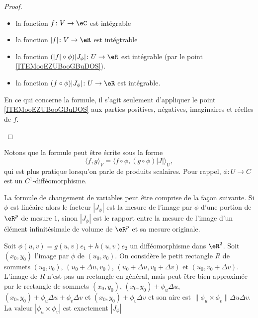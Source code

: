 \begin{proof}
\begin{enumerate}
            \begin{itemize}
                \item la fonction \( f\colon V\to \eC\) est intégrable
                \item la fonction \( | f |\colon V\to \eR\) est intégtrable
                \item la fonction \( (| f |\circ\phi)| J_{\phi} |\colon U\to \eR\) est intégrable (par le point \ref{ITEMooEZUBooGBuDOS}).
                \item la fonction \( (f\circ\phi)| J_{\phi} |\colon U\to \eR\) est intégrable.
            \end{itemize}
            En ce qui concerne la formule, il s'agit seulement d'appliquer le point \ref{ITEMooEZUBooGBuDOS} aux parties positives, négatives, imaginaires et réelles de \( f\).
    \end{enumerate}
\end{proof}

Notons que la formule peut être écrite sous la forme
\begin{equation}        \label{EQooQKARooELPCFO}
    \langle f, g\rangle_V=\langle f\circ\phi, (g\circ\phi)| J |\rangle_U,
\end{equation}
qui est plus pratique lorsqu'on parle de produits scalaires. Pour rappel, \( \phi\colon U\to C\) est un \( C^1\)-difféomorphisme.

\begin{normaltext}
La formule de changement de variables peut être comprise de la façon suivante. Si $\phi$ est linéaire  alors le facteur $|J_{\phi}|$ est la mesure de l'image par $\phi$ d'une portion de $\eR^p$ de mesure $1$, sinon  $|J_{\phi}|$ est le rapport entre la mesure de l'image d'un élément infinitésimale de volume de $\eR^p$ et sa mesure originale. 

Soit $\phi(u,v)=g(u,v)e_1+h(u,v)e_2$ un difféomorphisme dans $\eR^2$. Soit $(x_0, y_0)$ l'image par $\phi$ de $(u_0,v_0)$. On considère le petit rectangle $R$ de sommets $(u_0,v_0)$, $(u_0+\Delta u,v_0)$, $(u_0+\Delta u,v_0+\Delta v)$ et $(u_0,v_0+\Delta v)$. L'image de $R$ n'est pas un rectangle en général, mais peut être bien approximée par le rectangle de sommets $(x_0,y_0)$, $(x_0 ,y_0)+ \phi_{u}\Delta u$, $(x_0 ,y_0)+\phi_{u}\Delta u +\phi_{v}\Delta v$ et  $(x_0 ,y_0)+ \phi_{v}\Delta v$ et son aire est $\| \phi_{u}\times \phi_{v}\| \Delta u\Delta v$. La valeur $|\phi_{u}\times \phi_{v}|$ est exactement $|J_{\phi}|$ 
\end{normaltext}

